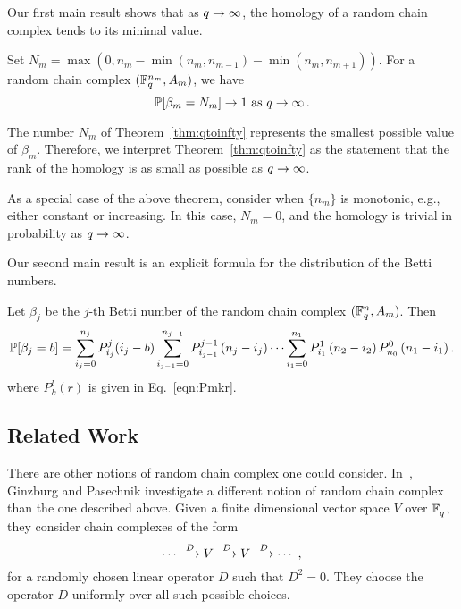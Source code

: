 Our first main result shows that as $q \rightarrow \infty$, the homology of a 
random chain complex tends to its minimal value.

\begin{bigthm}
  \label{thm:qtoinfty}
  Set $N_m = \max(0,n_m - \min(n_{m},n_{m-1}) - \min(n_m,n_{m+1}))$. 
  For a random chain complex $(\mathbb{F}_q^{n_m},A_m)$, we have
  \[
    \mathbb{P}[\beta_m = N_m] \rightarrow 1 
    \mbox{ as } q \rightarrow \infty  \, .
  \]
\end{bigthm}

\begin{remark}
  \label{rem:smallest}
  The number $N_m$ of Theorem~\ref{thm:qtoinfty} represents the smallest
  possible value of $\beta_m$. Therefore, we interpret Theorem~\ref{thm:qtoinfty}
  as the statement that the rank of the homology is as small as possible as 
  $q \rightarrow \infty$.
\end{remark}

\begin{remark}
  \label{rem:monotone}
  As a special case of the above theorem, consider when $\{n_m\}$
  is monotonic, e.g., either constant or increasing. In this case, 
  $N_m = 0$, and the homology is trivial in probability as $q \rightarrow \infty$.
\end{remark}


Our second main result is an explicit formula for the distribution
of the Betti numbers.
\begin{bigthm} 
  \label{thm:bettinum}
  Let $\beta_j$ be the $j$-th Betti number of the random chain complex
  $(\mathbb{F}_q^{n} , A_m)$. Then
  \[    
    \mathbb{P}[\beta_j = b] = \sum_{i_j=0}^{n_{j}} P_{i_j}^{j}(i_j-b)
    \sum_{i_{j-1}=0}^{n_{j-1}} P_{i_{j-1}}^{j-1}\left(n_{j} -i_j\right) \cdots
    \sum_{i_1 = 0}^{n_1} P_{i_1}^1\left(n_2 - i_2\right) P_{n_0}^0 \left(n_1 - i_1\right).
  \]
  where $P^l_k(r)$ is given in Eq.~\eqref{eqn:Pmkr}.
\end{bigthm}

\subsection*{Related Work} There are other notions of random chain complex
one could consider. In~\cite{ginzburg2017random}, Ginzburg and Pasechnik investigate
a different notion of random chain complex than the one described above.
Given a finite dimensional vector space $V$ over $\mathbb{F}_q^{}$, they consider chain
complexes of the form
\[
  \cdots \stackrel{D}{\longrightarrow} V \stackrel{D}{\longrightarrow} V \stackrel{D}{\longrightarrow} \cdots \, \, ,
\]
for a randomly chosen linear operator $D$ such that $D^2 = 0$. They choose the 
operator $D$ uniformly over all such possible choices. 

